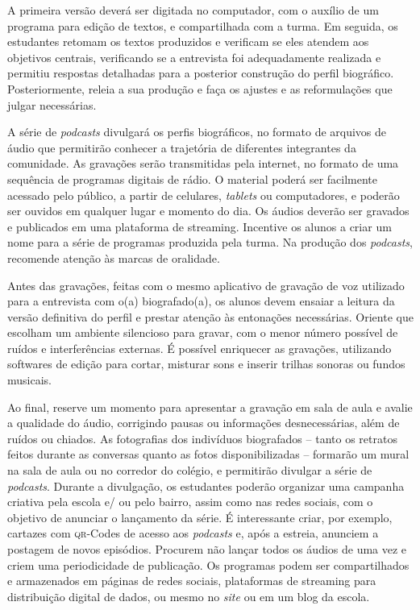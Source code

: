 \documentclass[11pt]{extarticle}
\begin{document}
A primeira versão deverá ser digitada no computador, com o auxílio de um
programa para edição de textos, e compartilhada com a turma. Em seguida,
os estudantes retomam os textos produzidos e verificam se eles atendem
aos objetivos centrais, verificando se a entrevista foi adequadamente
realizada e permitiu respostas detalhadas para a posterior construção do
perfil biográfico. Posteriormente, releia a sua produção e faça os
ajustes e as reformulações que julgar necessárias.

A série de \emph{podcasts} divulgará os perfis biográficos, no formato
de arquivos de áudio que permitirão conhecer a trajetória de diferentes
integrantes da comunidade. As gravações serão transmitidas pela
internet, no formato de uma sequência de programas digitais de rádio. O
material poderá ser facilmente acessado pelo público, a partir de
celulares, \emph{tablets} ou computadores, e poderão ser ouvidos em
qualquer lugar e momento do dia. Os áudios deverão ser gravados e
publicados em uma plataforma de streaming. Incentive os alunos a criar
um nome para a série de programas produzida pela turma. Na produção dos
\emph{podcasts}, recomende atenção às marcas de oralidade.

Antes das gravações, feitas com o mesmo aplicativo de gravação de voz
utilizado para a entrevista com o(a) biografado(a), os alunos devem
ensaiar a leitura da versão definitiva do perfil e prestar atenção às
entonações necessárias. Oriente que escolham um ambiente silencioso para
gravar, com o menor número possível de ruídos e interferências externas.
É possível enriquecer as gravações, utilizando softwares de edição para
cortar, misturar sons e inserir trilhas sonoras ou fundos musicais.

Ao final, reserve um momento para apresentar a gravação em sala de aula
e avalie a qualidade do áudio, corrigindo pausas ou informações
desnecessárias, além de ruídos ou chiados. As fotografias dos indivíduos
biografados -- tanto os retratos feitos durante as conversas quanto as
fotos disponibilizadas -- formarão um mural na sala de aula ou no
corredor do colégio, e permitirão divulgar a série de \emph{podcasts}.
Durante a divulgação, os estudantes poderão organizar uma campanha
criativa pela escola e/ ou pelo bairro, assim como nas redes sociais,
com o objetivo de anunciar o lançamento da série. É interessante criar,
por exemplo, cartazes com \textsc{qr}-Codes de acesso aos \emph{podcasts} e, após
a estreia, anunciem a postagem de novos episódios. Procurem não lançar
todos os áudios de uma vez e criem uma periodicidade de publicação. Os
programas podem ser compartilhados e armazenados em páginas de redes
sociais, plataformas de streaming para distribuição digital de dados, ou
mesmo no \emph{site} ou em um blog da escola.
\end{document}
